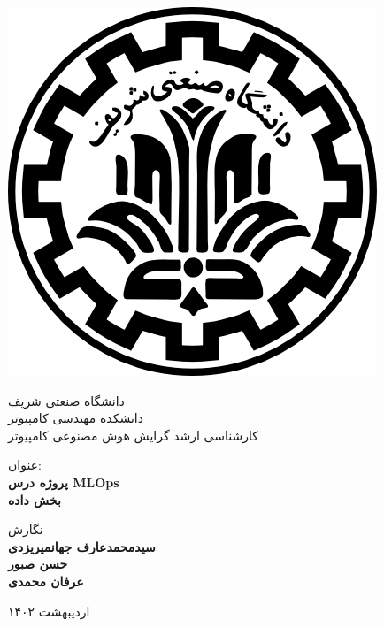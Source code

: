 
\begin{center}

    \includegraphics[scale=0.2]{resources/styles/images/logo.png}
    
    \vspace{-0.2cm}
    {دانشگاه صنعتی شریف} \\[-0.3em]
    {دانشکده مهندسی کامپیوتر}\\
    {کارشناسی ارشد گرایش هوش مصنوعی کامپیوتر}  %
    
    \begin{large}
    \vspace{0.5cm}
    
    
    \end{large}
    
    \vspace{1.3cm}
    
    {عنوان:}\\[1.2em]
    {\LARGE\textbf{پروژه درس MLOps}}\\ 
    \vspace{0.8cm}
    {\Large\textbf{بخش داده}}
    
    \vspace{1.8cm}
    
    {نگارش}\\[.5em]
    {\large\textbf{سیدمحمدعارف جهانمیریزدی}}\\
    {\large\textbf{حسن صبور}}\\
    {\large\textbf{عرفان محمدی}}\\
    
    \vspace{1cm}
    
    {\normalsize اردیبهشت ۱۴۰۲}
    
\end{center}
    
\newpage
    